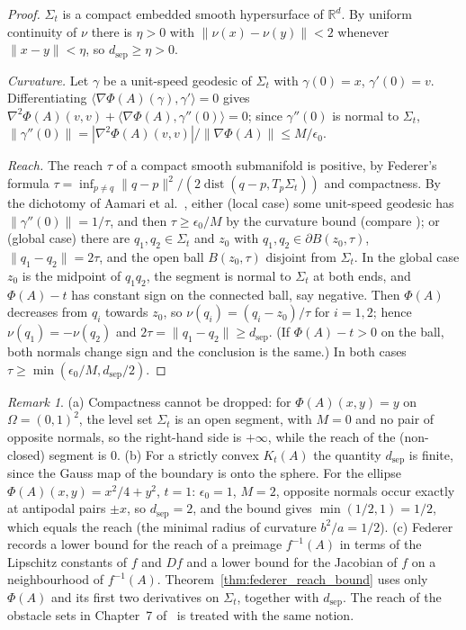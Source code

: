 \documentclass[11pt,a4paper,reqno]{amsart}
\theoremstyle{definition}
\theoremstyle{remark}
\newtheorem{remark}[theorem]{Remark}
\numberwithin{equation}{section}
\begin{document}
\begin{proof}
$\Sigma_t$ is a compact embedded smooth hypersurface of $\mathbb{R}^d$. By uniform continuity of $\nu$ there is $\eta > 0$ with $\|\nu(x) - \nu(y)\| < 2$ whenever $\|x-y\| < \eta$, so $d_{\mathrm{sep}} \ge \eta > 0$.

\emph{Curvature.} Let $\gamma$ be a unit-speed geodesic of $\Sigma_t$ with $\gamma(0) = x$, $\gamma'(0) = v$. Differentiating $\langle \nabla\Phi(A)(\gamma), \gamma'\rangle = 0$ gives $\nabla^2\Phi(A)(v, v) + \langle\nabla\Phi(A), \gamma''(0)\rangle = 0$; since $\gamma''(0)$ is normal to $\Sigma_t$, $\|\gamma''(0)\| = |\nabla^2\Phi(A)(v,v)|/\|\nabla\Phi(A)\| \le M/\epsilon_0$.

\emph{Reach.} The reach $\tau$ of a compact smooth submanifold is positive, by Federer's formula $\tau = \inf_{p\ne q}\|q-p\|^2/(2\operatorname{dist}(q-p, T_p\Sigma_t))$ \cite[Thm.~4.18]{Federer1959} and compactness. By the dichotomy of Aamari et al.\ \cite[Thm.~3.4]{Aamari2019}, either (local case) some unit-speed geodesic has $\|\gamma''(0)\| = 1/\tau$, and then $\tau \ge \epsilon_0/M$ by the curvature bound (compare \cite[Prop.~6.1]{NiyogiSmaleWeinberger2008}); or (global case) there are $q_1, q_2 \in \Sigma_t$ and $z_0$ with $q_1, q_2 \in \partial B(z_0, \tau)$, $\|q_1 - q_2\| = 2\tau$, and the open ball $B(z_0, \tau)$ disjoint from $\Sigma_t$. In the global case $z_0$ is the midpoint of $q_1 q_2$, the segment is normal to $\Sigma_t$ at both ends, and $\Phi(A) - t$ has constant sign on the connected ball, say negative. Then $\Phi(A)$ decreases from $q_i$ towards $z_0$, so $\nu(q_i) = (q_i - z_0)/\tau$ for $i = 1, 2$; hence $\nu(q_1) = -\nu(q_2)$ and $2\tau = \|q_1 - q_2\| \ge d_{\mathrm{sep}}$. (If $\Phi(A) - t > 0$ on the ball, both normals change sign and the conclusion is the same.) In both cases $\tau \ge \min(\epsilon_0/M, d_{\mathrm{sep}}/2)$.
\end{proof}

\begin{remark}
\label{rem:reach_examples}
(a) Compactness cannot be dropped: for $\Phi(A)(x,y) = y$ on $\Omega = (0,1)^2$, the level set $\Sigma_t$ is an open segment, with $M = 0$ and no pair of opposite normals, so the right-hand side is $+\infty$, while the reach of the (non-closed) segment is $0$.
(b) For a strictly convex $K_t(A)$ the quantity $d_{\mathrm{sep}}$ is finite, since the Gauss map of the boundary is onto the sphere. For the ellipse $\Phi(A)(x,y) = x^2/4 + y^2$, $t = 1$: $\epsilon_0 = 1$, $M = 2$, opposite normals occur exactly at antipodal pairs $\pm x$, so $d_{\mathrm{sep}} = 2$, and the bound gives $\min(1/2, 1) = 1/2$, which equals the reach (the minimal radius of curvature $b^2/a = 1/2$).
(c) Federer \cite[4.21]{Federer1959} records a lower bound for the reach of a preimage $f^{-1}(A)$ in terms of the Lipschitz constants of $f$ and $Df$ and a lower bound for the Jacobian of $f$ on a neighbourhood of $f^{-1}(A)$. Theorem~\ref{thm:federer_reach_bound} uses only $\Phi(A)$ and its first two derivatives on $\Sigma_t$, together with $d_{\mathrm{sep}}$. The reach of the obstacle sets in Chapter~7 of~\cite{silvafilho2026book} is treated with the same notion.
\end{remark}
\end{document}
